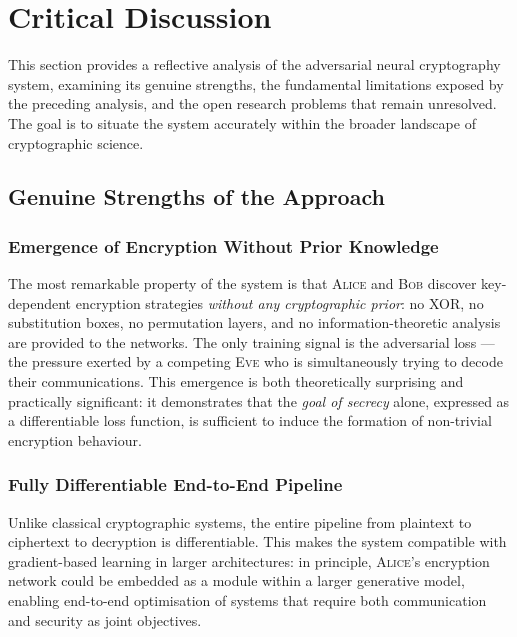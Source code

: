 \documentclass[12pt, a4paper]{article}
\newcommand{\alice}{\textsc{Alice}}
\newcommand{\bob}{\textsc{Bob}}
\newcommand{\eve}{\textsc{Eve}}
\begin{document}
\section{Critical Discussion}
\label{sec:discussion}

This section provides a reflective analysis of the adversarial neural
cryptography system, examining its genuine strengths, the fundamental
limitations exposed by the preceding analysis, and the open research
problems that remain unresolved. The goal is to situate the system
accurately within the broader landscape of cryptographic science.

\subsection{Genuine Strengths of the Approach}
\label{subsec:strengths}

\subsubsection*{Emergence of Encryption Without Prior Knowledge}

The most remarkable property of the system is that \alice{} and \bob{}
discover key-dependent encryption strategies \emph{without any
cryptographic prior}: no XOR, no substitution boxes, no permutation
layers, and no information-theoretic analysis are provided to the
networks. The only training signal is the adversarial loss --- the
pressure exerted by a competing \eve{} who is simultaneously trying
to decode their communications. This emergence is both theoretically
surprising and practically significant: it demonstrates that the
\emph{goal of secrecy} alone, expressed as a differentiable loss
function, is sufficient to induce the formation of non-trivial
encryption behaviour.

\subsubsection*{Fully Differentiable End-to-End Pipeline}

Unlike classical cryptographic systems, the entire pipeline from
plaintext to ciphertext to decryption is differentiable. This
makes the system compatible with gradient-based learning in larger
architectures: in principle, \alice{}'s encryption network could
be embedded as a module within a larger generative model, enabling
end-to-end optimisation of systems that require both communication
and security as joint objectives.
\end{document}
